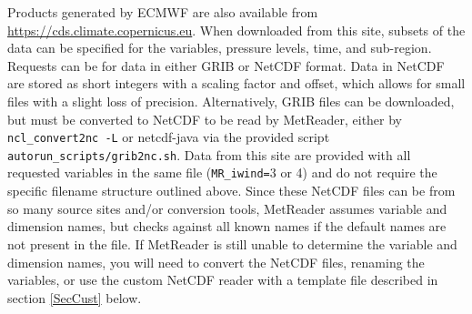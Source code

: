 \documentclass[11pt]{article}   %
\begin{document}
Products generated by ECMWF are also available from \url{https://cds.climate.copernicus.eu}.
When downloaded from this site, subsets of the data can be specified for the variables, 
pressure levels, time, and sub-region. Requests can be for data in either GRIB or NetCDF
format. Data in NetCDF are stored as short integers with a scaling factor and offset, which
allows for small files with a slight loss of precision.  Alternatively, GRIB files can
be downloaded, but must be converted to NetCDF to be read by MetReader, either by
\texttt{ncl\_convert2nc -L} or netcdf-java via the provided script \texttt{autorun\_scripts/grib2nc.sh}.
Data from this site are provided with all requested variables in the same file 
(\texttt{MR\_iwind=}3 or 4) and do not require the specific filename structure outlined above.
Since these NetCDF files can be from so many source sites and/or conversion tools, MetReader
assumes variable and dimension names, but checks against all known names if the default
names are not present in the file.  If MetReader is still unable to determine the variable
and dimension names, you will need to convert the NetCDF files, renaming the variables, or
use the custom NetCDF reader with a template file described in section \ref{SecCust} below.
\end{document}
